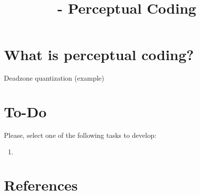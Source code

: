 


\title{\SM{} - Perceptual Coding}

\maketitle

\tableofcontents

\section{What is perceptual coding?}

Deadzone quantization (example)


\section{To-Do}
Please, select one of the following tasks to develop:
\begin{enumerate}
\item
\end{enumerate}

\section{References}

\renewcommand{\addcontentsline}[3]{}%

